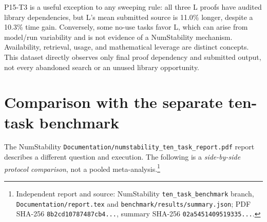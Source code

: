 \documentclass[10pt]{article}
\newcommand{\pathref}[1]{\nolinkurl{#1}}
\begin{document}
P15-T3 is a useful exception to any sweeping rule: all three L proofs have audited library dependencies, but L's mean submitted source is 11.0\% longer, despite a 10.3\% time gain. Conversely, some no-use tasks favor L, which can arise from model/run variability and is not evidence of a NumStability mechanism. Availability, retrieval, usage, and mathematical leverage are distinct concepts. This dataset directly observes only final proof dependency and submitted output, not every abandoned search or an unused library opportunity.

\clearpage
\section{Comparison with the separate ten-task benchmark}
The NumStability \pathref{Documentation/numstability_ten_task_report.pdf} report describes a different question and execution. The following is a \emph{side-by-side protocol comparison}, not a pooled meta-analysis.\footnote{Independent report and source: NumStability \texttt{ten\_task\_benchmark} branch, \pathref{Documentation/report.tex} and \pathref{benchmark/results/summary.json}; PDF SHA-256 \texttt{8b2cd10787487cb4...}, summary SHA-256 \texttt{02a5451409519335...}.}
\end{document}

